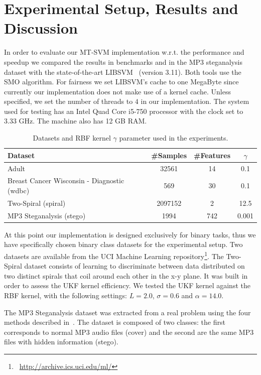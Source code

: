 \documentclass{llncs}
\begin{document}
\section{Experimental Setup, Results and Discussion}
\label{sec:exp_results}
In order to evaluate our MT-SVM implementation w.r.t. the performance and speedup we compared the results in  benchmarks and in the MP3 steganalysis dataset with the state-of-the-art LIBSVM~\cite{Chang2011} (version 3.11). Both tools use the SMO algorithm. 
For fairness we set LIBSVM's cache to one MegaByte since currently our implementation does not make use of a kernel cache. Unless specified, we set the number of threads to $4$ in our implementation. The system used for testing has an Intel Quad Core i5-750 processor with the clock set to 3.33 GHz. The machine also has 12 GB RAM.
\begin{table}
	\begin{center}
\caption{Datasets and RBF kernel $\gamma$ parameter used in the experiments.}
\label{table:datasets}
		\begin{tabular}{ | l | c | c | c | }
		\hline
		Dataset & \#Samples & \#Features & $\gamma$ \\ \hline \hline
		\hline
		Adult &			32561 &	14 & 0.1\\  
		Breast Cancer Wisconsin - Diagnostic (wdbc) &	569   &	30 & 0.1\\ 
		Two-Spiral (spiral) & 		2097152  &	2  & 12.5\\ \hline
		MP3 Steganalysis (stego) & 		1994  &	742  & 0.001\\ \hline
		\end{tabular}
	\end{center}
\end{table}

At this point our implementation is designed exclusively for binary tasks, thus we have specifically chosen binary class datasets for the experimental setup. Two datasets are available from the UCI Machine Learning repository\footnote{~\url{http://archive.ics.uci.edu/ml/}}.
The Two-Spiral dataset consists of learning to discriminate between data distributed on two distinct spirals that coil around each other in the x-y plane. It was built in order to assess the \ac{UKF} kernel efficiency. We tested the \ac{UKF} kernel against  the \ac{RBF} kernel, with the following settings: $L = 2.0$, $\sigma = 0.6$ and $\alpha = 14.0$.  
 
The MP3 Steganalysis dataset was extracted from a real problem using the four methods described in~\cite{Qiao2009}. The dataset is composed of two classes: the first corresponds to normal MP3 audio files (cover) and the second are the same MP3 files with hidden information (stego). %
\end{document}
